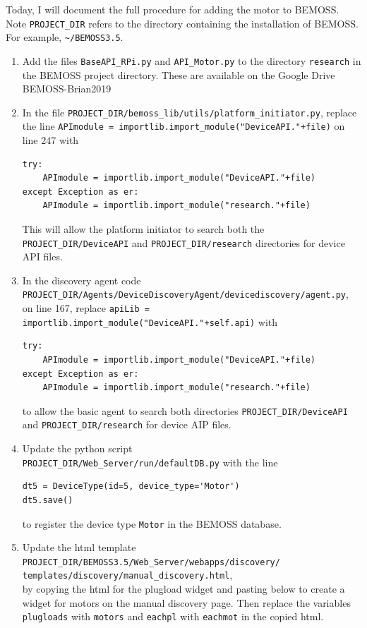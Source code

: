 \documentclass[fontsize=11pt, %
                             paper=letter, %
                             twoside, %
                             captions=tableheading,
                             index=totoc,
                             hyperref]{labbook}
\begin{document}
\begin{addmargin}[0cm]{0cm}
Today, I will document the full procedure for adding the motor to BEMOSS. Note \texttt{PROJECT\_DIR} refers to the directory containing the installation of BEMOSS. For example, \texttt{\textasciitilde/BEMOSS3.5}.
\begin{enumerate}
\item Add the files \texttt{BaseAPI\_RPi.py} and \texttt{API\_Motor.py} to the directory \texttt{research} in the BEMOSS project directory. These are available on the Google Drive BEMOSS-Brian2019
\item In the file \texttt{PROJECT\_DIR/bemoss\_lib/utils/platform\_initiator.py}, replace the line \texttt{APImodule = importlib.import\_module("DeviceAPI."+file)} on line 247 with 
\begin{Verbatim}[tabsize=4]
try:
	APImodule = importlib.import_module("DeviceAPI."+file)
except Exception as er:
	APImodule = importlib.import_module("research."+file)
\end{Verbatim}
This will allow the platform initiator to search both the \texttt{PROJECT\_DIR/DeviceAPI} and \texttt{PROJECT\_DIR/research} directories for device API files.
\item In the discovery agent code\\
\texttt{PROJECT\_DIR/Agents/DeviceDiscoveryAgent/devicediscovery/agent.py},\\
on line 167, replace \texttt{apiLib = importlib.import\_module("DeviceAPI."+self.api)} with
\begin{Verbatim}[tabsize = 4]
try:
	APImodule = importlib.import_module("DeviceAPI."+file)
except Exception as er:
	APImodule = importlib.import_module("research."+file)
\end{Verbatim}
to allow the basic agent to search both directories \texttt{PROJECT\_DIR/DeviceAPI} and \texttt{PROJECT\_DIR/research} for device AIP files.

\item Update the python script\\
\texttt{PROJECT\_DIR/Web\_Server/run/defaultDB.py} with the line 
\begin{verbatim}
dt5 = DeviceType(id=5, device_type='Motor')
dt5.save()
\end{verbatim}
to register the device type \texttt{Motor} in the BEMOSS database.
\item Update the html template\\
\texttt{PROJECT\_DIR/BEMOSS3.5/Web\_Server/webapps/discovery/\\
templates/discovery/manual\_discovery.html},\\
by copying the html for the plugload widget and pasting below to create a widget for motors on the manual discovery page. Then replace the variables \texttt{plugloads} with \texttt{motors} and \texttt{eachpl} with  \texttt{eachmot} in the copied html.


\end{enumerate}
\end{addmargin}
\end{document}
